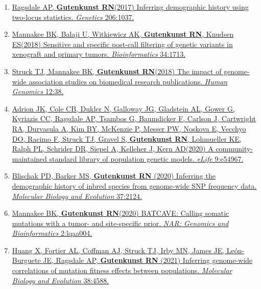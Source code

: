 \documentclass[11pt]{article}
\begin{document}
\begin{enumerate}
\item \href{https://doi.org/10.1534/genetics.117.201251}{Ragsdale AP\trainee\corresponding, \textbf{Gutenkunst RN}\corresponding (2017) Inferring demographic history using two-locus statistics. \emph{Genetics} 206:1037.}

\item \href{https://doi.org/10.1093/bioinformatics/bty010}{Mannakee BK\trainee \corresponding, Balaji U, Witkiewicz AK, \textbf{Gutenkunst RN}\corresponding, Knudsen ES\corresponding (2018)
Sensitive and specific post-call filtering of genetic variants in xenograft and primary tumors. \emph{Bioinformatics} 34:1713.}
	
\item \href{https://doi.org/10.1186/s40246-018-0172-4}{Struck TJ\trainee, Mannakee BK\trainee, \textbf{Gutenkunst RN}\corresponding (2018) The impact of genome-wide association studies on biomedical research publications. \emph{Human Genomics} 12:38.}



\item \href{https://doi.org/10.7554/eLife.54967}{Adrion JK\equal, Cole CB\equal, Dukler N\equal, Galloway JG\equal, Gladstein AL\equal, Gower G\equal, Kyriazis CC\equal, Ragsdale AP\equal, Tsambos G\equal, Baumdicker F, Carlson J, Cartwright RA, Durvasula A, Kim BY, McKenzie P, Messer PW, Noskova E, Vecchyo DO, Racimo F, Struck TJ\trainee, Gravel S, \textbf{Gutenkunst RN}, Lohmueller KE, Ralph PL, Schrider DR, Siepel A, Kelleher J\corresponding, Kern AD\corresponding (2020) A community-maintained standard library of population genetic models. \emph{eLife} 9:e54967.}

\item \href{https://doi.org/10.1093/molbev/msaa042}{Blischak PD\trainee\corresponding, Barker MS, \textbf{Gutenkunst RN} (2020) Inferring the demographic history of inbred species from genome-wide SNP frequency data. \emph{Molecular Biology and Evolution} 37:2124.}

\item \href{https://doi.org/10.1093/nargab/lqaa004}{Mannakee BK\trainee, \textbf{Gutenkunst RN}\corresponding (2020) BATCAVE: Calling somatic mutations with a tumor- and site-specific prior. \emph{NAR: Genomics and Bioinformatics} 2:lqaa004.}


\item \href{https://doi.org/10.1093/molbev/msab162}{Huang X\trainee, Fortier AL\trainee, Coffman AJ\trainee, Struck TJ\trainee, Irby MN\trainee, James JE\trainee, Le\'on-Burguete JE\trainee, Ragsdale AP\trainee, \textbf{Gutenkunst RN}\corresponding
(2021) Inferring genome-wide correlations of mutation fitness effects between populations. \emph{Molecular Biology and Evolution} 38:4588.}


\end{enumerate}
\end{document}

